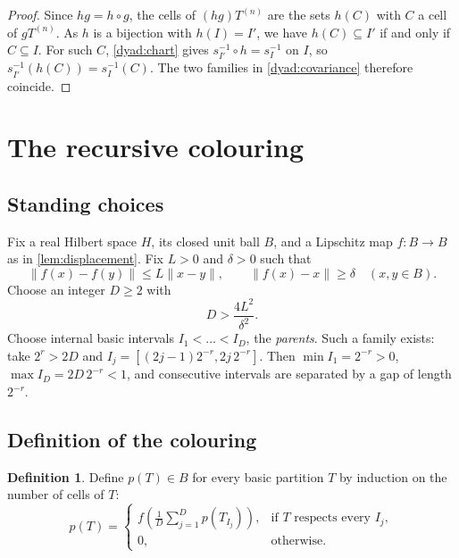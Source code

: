 \documentclass[11pt]{article}
\newcommand{\norm}[1]{\lVert #1\rVert}
\theoremstyle{definition}
\newtheorem{definition}[theorem]{Definition}
\numberwithin{equation}{section}
\begin{document}
\begin{proof}
Since \(hg=h\circ g\), the cells of \((hg)T^{(n)}\) are the sets \(h(C)\)
with \(C\) a cell of \(gT^{(n)}\). As \(h\) is a bijection with
\(h(I)=I'\), we have \(h(C)\subseteq I'\) if and only if \(C\subseteq I\).
For such \(C\), \eqref{dyad:chart} gives \(s_{I'}^{-1}\circ h=s_I^{-1}\) on
\(I\), so \(s_{I'}^{-1}(h(C))=s_I^{-1}(C)\). The two families in
\eqref{dyad:covariance} therefore coincide.
\end{proof}

\section{The recursive colouring}\label{sec:coloring}

\subsection{Standing choices}
Fix a real Hilbert space \(H\), its closed unit ball \(B\), and a
Lipschitz map \(f:B\to B\) as in \cref{lem:displacement}. Fix
\(L>0\) and \(\delta>0\) such that
\begin{equation}\label{color:map}
  \norm{f(x)-f(y)}\le L\norm{x-y},\qquad
  \norm{f(x)-x}\ge\delta
  \quad(x,y\in B).
\end{equation}
Choose an integer \(D\ge2\) with
\begin{equation}\label{color:parameters}
  D>\frac{4L^2}{\delta^2}.
\end{equation}
Choose internal basic intervals \(I_1<\dots<I_D\), the \emph{parents}.
Such a family exists: take \(2^r>2D\) and
\(I_j=[(2j-1)2^{-r},2j\,2^{-r}]\). Then \(\min I_1=2^{-r}>0\),
\(\max I_D=2D\,2^{-r}<1\), and consecutive intervals are separated by a gap
of length \(2^{-r}\).

\subsection{Definition of the colouring}

\begin{definition}\label{color:def}
Define \(p(T)\in B\) for every basic partition \(T\) by induction on the
number of cells of \(T\):
\begin{equation}\label{color:recursion}
  p(T)=
  \begin{cases}
  \displaystyle f\left(\frac1D\sum_{j=1}^D p(T_{I_j})\right),
       &\text{if \(T\) respects every \(I_j\)},\\[6pt]
  0,   &\text{otherwise}.
  \end{cases}
\end{equation}
\end{definition}
\end{document}

